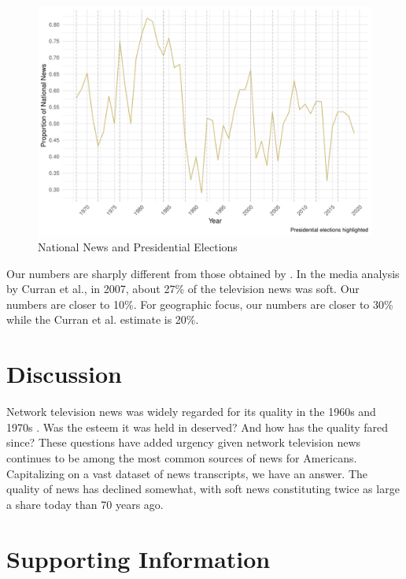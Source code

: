 \documentclass[12pt, letterpaper]{article}
\begin{document}
\begin{figure}[H]
  \centering
  \caption{National News and Presidential Elections}
  \label{fig:national_president}
  \includegraphics[width=.95\linewidth]{../figs/fig_geography_presidential.pdf}
\end{figure}

Our numbers are sharply different from those obtained by \cite{curran2009media}. In the media analysis by Curran et al., in 2007, about 27\% of the television news was soft. Our numbers are closer to 10\%. For geographic focus, our numbers are closer to 30\% while the Curran et al. estimate is 20\%.

\section*{Discussion}
Network television news was widely regarded for its quality in the 1960s and 1970s \citep{hallin1990whatever}. Was the esteem it was held in deserved? And how has the quality fared since? These questions have added urgency given network television news continues to be among the most common sources of news for Americans. Capitalizing on a vast dataset of news transcripts, we have an answer. The quality of news has declined somewhat, with soft news constituting twice as large a share today than 70 years ago.

\clearpage



\clearpage
\appendix
\renewcommand{\thesection}{SI \arabic{section}}
\renewcommand\thetable{\thesection.\arabic{table}}
\renewcommand\thefigure{\thesection.\arabic{figure}}

\section{Supporting Information}
\end{document}
